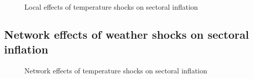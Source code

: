 \documentclass[
  letterpaper,
  DIV=11,
  numbers=noendperiod]{scrartcl}
\begin{document}
\begin{figure}[H]


\caption{\label{fig-baseline_direct}Local effects of temperature shocks
on sectoral inflation}

\end{figure}%

\subsection{Network effects of weather shocks on sectoral
inflation}\label{network-effects-of-weather-shocks-on-sectoral-inflation}

\begin{figure}[H]


\caption{\label{fig-baseline_network}Network effects of temperature
shocks on sectoral inflation}

\end{figure}%
\end{document}
